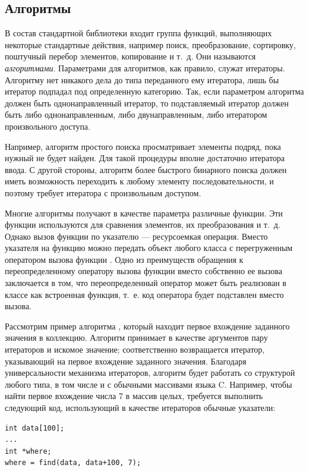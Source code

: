 \subsection[Алгоритмы]{Алгоритмы}
В состав стандартной библиотеки входит группа функций, выполняющих некоторые стандартные действия, например поиск,
преобразование, сортировку, поштучный перебор элементов, копирование и т.~д. Они называются
\emph{алгоритмами}. Параметрами для алгоритмов, как правило, служат
итераторы. Алгоритму нет никакого дела до типа переданного ему итератора, лишь бы итератор подпадал под определенную
категорию. Так, если параметром алгоритма должен быть однонаправленный итератор, то подставляемый итератор должен быть
либо однонаправленным, либо двунаправленным, либо итератором произвольного доступа. 

Например, алгоритм простого поиска  просматривает элементы подряд, пока нужный не будет
найден. Для такой процедуры вполне достаточно итератора ввода. С другой стороны, алгоритм более быстрого бинарного
поиска  должен иметь возможность переходить к любому элементу последовательности, и
поэтому требует итератора с произвольным доступом.

Многие алгоритмы получают в качестве параметра различные функции. Эти функции используются для сравнения элементов, их
преобразования и т.~д. Однако вызов функции по указателю --- ресурсоемкая операция. Вместо указателя на функцию можно
передать объект любого класса с перегруженным оператором вызова функции . Одно из
преимуществ обращения к переопределенному оператору вызова функции вместо собственно ее вызова заключается в том, что
переопределенный оператор может быть реализован в классе как встроенная функция, т.~е. код оператора будет подставлен
вместо вызова.

Рассмотрим пример алгоритма , который находит первое вхождение заданного значения в коллекцию.
Алгоритм принимает в качестве аргументов пару итераторов и искомое значение; соответственно возвращается итератор,
указывающий на первое вхождение заданного значения. Благодаря универсальности механизма итераторов, алгоритм будет
работать со структурой любого типа, в том числе и с обычными массивами языка C. Например, чтобы найти первое вхождение
числа 7 в массив целых, требуется выполнить следующий код, использующий в качестве итераторов обычные указатели:
\begin{lstlisting}
int data[100];
...
int *where;
where = find(data, data+100, 7);
\end{lstlisting}

